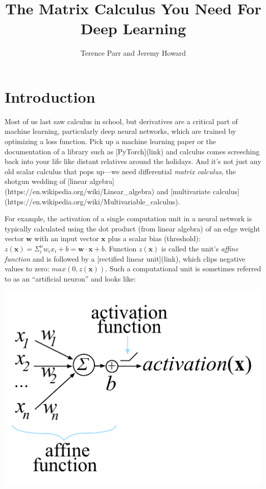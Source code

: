 \documentclass[11pt]{article}
\title{The Matrix Calculus You Need For Deep Learning}
\author{Terence Parr and Jeremy Howard}
\begin{document}
\maketitle

\allowdisplaybreaks

\section{Introduction}

Most of us last saw calculus in school, but derivatives are a critical part of machine learning, particularly deep neural networks, which are trained by optimizing a loss function. Pick up a machine learning paper or the documentation of a library such as [PyTorch](link) and calculus comes screeching back into your life like distant relatives around the holidays.  And it's not just any old scalar calculus that pops up---we need differential {\em matrix calculus}, the shotgun wedding of [linear algebra](https://en.wikipedia.org/wiki/Linear\_algebra) and [multivariate calculus](https://en.wikipedia.org/wiki/Multivariable\_calculus).

For example, the activation of a single computation unit in a neural network is typically calculated using the dot product (from linear algebra) of an edge weight vector $\mathbf{w}$ with an input vector $\mathbf{x}$ plus a scalar bias (threshold): $z(\mathbf{x}) = \Sigma_i^n w_i x_i + b = \mathbf{w} \cdot \mathbf{x} + b$. Function $z(\mathbf{x})$ is called the unit's {\em affine function} and is followed by a [rectified linear unit](link), which clips negative values to zero: $max(0, z(\mathbf{x}))$. Such a computational unit is sometimes referred to as an ``artificial neuron'' and looks like:

\begin{center}
	\includegraphics[scale=.9]{neuron.png}
\end{center}
\end{document}
